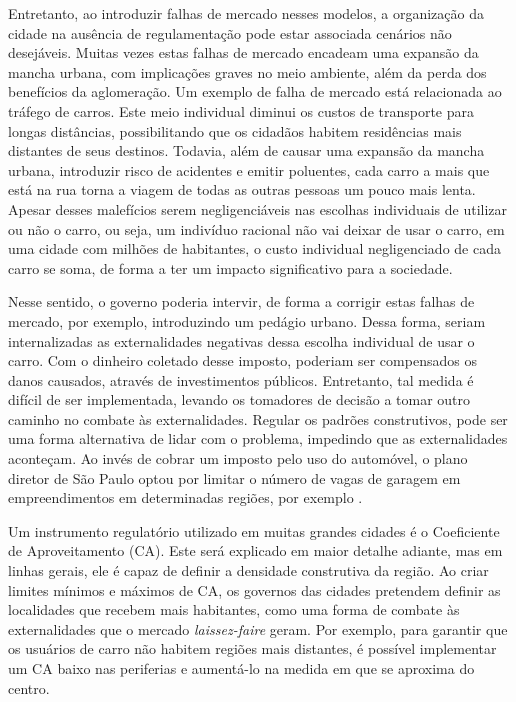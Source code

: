 Entretanto, ao introduzir falhas de mercado nesses modelos, a organização da cidade na ausência de regulamentação pode estar associada cenários não desejáveis. Muitas vezes estas falhas de mercado encadeam uma expansão da mancha urbana, com implicações graves no meio ambiente, além da perda dos benefícios da aglomeração. Um exemplo de falha de mercado está relacionada ao tráfego de carros. Este meio individual diminui os custos de transporte para longas distâncias, possibilitando que os cidadãos habitem residências mais distantes de seus destinos. Todavia, além de causar uma expansão da mancha urbana, introduzir risco de acidentes e emitir poluentes, cada carro a mais que está na rua torna a viagem de todas as outras pessoas um pouco mais lenta. Apesar desses malefícios serem negligenciáveis nas escolhas individuais de utilizar ou não o carro, ou seja, um indivíduo racional não vai deixar de usar o carro, em uma cidade com milhões de habitantes, o custo individual negligenciado de cada carro se soma, de forma a ter um impacto significativo para a sociedade.

Nesse sentido, o governo poderia intervir, de forma a corrigir estas falhas de mercado, por exemplo, introduzindo um pedágio urbano. Dessa forma, seriam internalizadas as externalidades negativas dessa escolha individual de usar o carro. Com o dinheiro coletado desse imposto, poderiam ser compensados os danos causados, através de investimentos públicos. Entretanto, tal medida é difícil de ser implementada, levando os tomadores de decisão a tomar outro caminho no combate às externalidades. Regular os padrões construtivos, pode ser uma forma alternativa de lidar com o problema, impedindo que as externalidades aconteçam. Ao invés de cobrar um imposto pelo uso do automóvel, o plano diretor de São Paulo optou por limitar o número de vagas de garagem em empreendimentos em determinadas regiões, por exemplo \cite{PDE}.

Um instrumento regulatório utilizado em muitas grandes cidades é o Coeficiente de Aproveitamento (CA). Este será explicado em maior detalhe adiante, mas em linhas gerais, ele é capaz de definir a densidade construtiva da região. Ao criar limites mínimos e máximos de CA, os governos das cidades pretendem definir as localidades que recebem mais habitantes, como uma forma de combate às externalidades que o mercado \textit{laissez-faire} geram. Por exemplo, para garantir que os usuários de carro não habitem regiões mais distantes, é possível implementar um CA baixo nas periferias e aumentá-lo na medida em que se aproxima do centro. 

